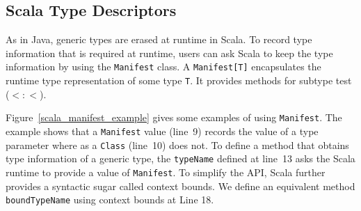\subsection{Scala Type Descriptors}

As in Java, generic types are erased at runtime in Scala.
To record type information that is required at runtime, users can ask Scala to 
keep the type information by using the {\tt Manifest} class.  
A {\tt Manifest[T]} encapsulates the runtime type representation 
of some type {\tt T}.  It provides methods for subtype test ($<:<$).

Figure~\ref{scala_manifest_example} gives some examples of using
{\tt Manifest}.  The example shows that a {\tt Manifest} value (line~9)
records the value of a type parameter where as a {\tt Class} (line~10) does not.
To define a method that obtains type information of a generic type, 
the {\tt typeName} defined at line~13 asks the Scala runtime to provide
a value of {\tt Manifest}.  To simplify the API, Scala further provides a syntactic 
sugar called context bounds. We define an equivalent method {\tt boundTypeName}
using context bounds at Line 18.


\begin{comment}
\begin{figure}[p]
\begin{lstlisting}[language=scala]
import scala.reflect._

object ManifestExample extends App {
  assert(List(1,2.0,"3").isInstanceOf[List[String]])
  // Compiler Warning :non-variable type argument String in type List[String] is unchecked since it is eliminated by 
  // erasure
  
  case class Foo[A](a: A)
  type F = Foo[_]
  assert(classManifest[F].toString.equals(
            "sample.other.ManifestExample$Foo[<?>]"))
  assert(NoManifest.toString.equals("<?>"))
  
  assert(manifest[List[Int]].toString.equals(
            "scala.collection.immutable.List[Int]"))
  assert(manifest[List[Int]].erasure.toString.equals(
            "class scala.collection.immutable.List"))
  
  def typeName[T](x: T)(implicit m: Manifest[T]): String  = {
    m.toString
  }
  assert(typeName(2).equals("Int"))
    
  def boundTypeName[T:Manifest](x: T):String = {
    manifest[T].toString
  }
  assert(boundTypeName(2).equals("Int"))
  
  def isSubType[T: Manifest, U: Manifest] = manifest[T] <:< manifest[U]
  assert(isSubType[List[String], List[AnyRef]])
  assert(! isSubType[List[String], List[Int]]) 
}
\end{lstlisting}
\caption{Scala Example: Manifest Example}
\label{scala_manifest_example}
\end{figure}
\end{comment}

